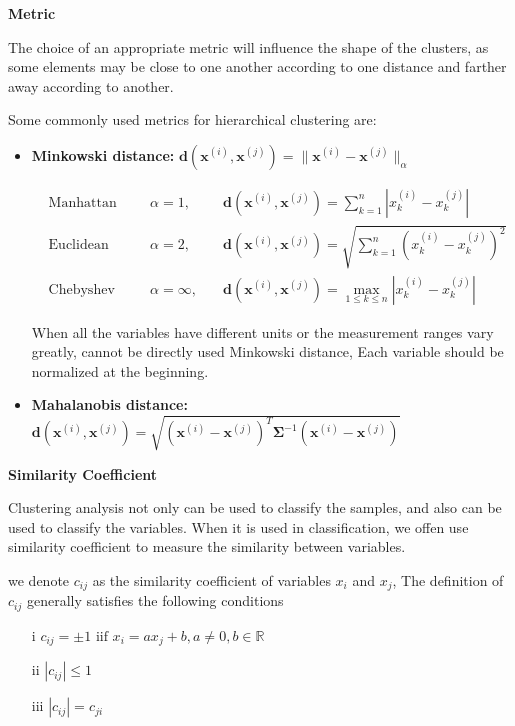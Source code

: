 \noindent\textbf{Metric}

The choice of an appropriate metric will influence the shape of the clusters, as some elements may be close to one another according to one distance and farther away according to another.

Some commonly used metrics for hierarchical clustering are:

\begin{itemize}
\item \textbf{Minkowski distance:} $\mathbf{d}(\boldsymbol x^{(i)},\boldsymbol x^{(j)}) = \|\boldsymbol x^{(i)} - \boldsymbol x^{(j)}\|_\alpha$
	
	\begin{align*}
	&\text{Manhattan distance:} &\alpha = 1,\quad &\mathbf{d}(\boldsymbol x ^{(i)},\boldsymbol x ^{(j)}) = \sum_{k=1}^n|x_{k}^{(i)}-x_{k}^{(j)}|\\
	&\text{Euclidean distance:}  &\alpha = 2,\quad &\mathbf{d}(\boldsymbol x ^{(i)},\boldsymbol x ^{(j)}) = \sqrt{\sum_{k=1}^n(x_{k}^{(i)}-x_{k}^{(j)})^2}\\
	&\text{Chebyshev distance:}  &\alpha = \infty,\quad &\mathbf{d}(\boldsymbol x ^{(i)},\boldsymbol x ^{(j)}) = \max_{1\leq k \leq n}|x_{k}^{(i)}-x_{k}^{(j)}|
	\end{align*}

When all the variables have different units or the measurement ranges vary greatly, cannot be directly used Minkowski distance, Each variable should be normalized at the beginning.


\item \textbf{Mahalanobis distance:} $\mathbf{d}(\boldsymbol x ^{(i)},\boldsymbol x ^{(j)}) = \sqrt{(\boldsymbol x ^{(i)} - \boldsymbol x ^{(j)})^T\mathbf{\Sigma}^{-1} (\boldsymbol x ^{(i)} - \boldsymbol x ^{(j)})}$

\end{itemize}


\noindent\textbf{Similarity Coefficient}

Clustering analysis not only can be used to classify the samples, and also can be used to classify the variables. When it is used in classification, we offen use similarity coefficient to measure the similarity between variables.

we denote $c_{ij}$ as the similarity coefficient of variables $x_i$ and $x_j$, The definition of $c_{ij}$ generally satisfies the following conditions

\begin{itemize}
	\item[i] $c_{ij}=\pm 1\text{ iif } x_i = ax_j + b, a\neq 0, b\in\mathbb{R}$
	\item[ii] $|c_{ij}| \leq 1$
	\item[iii] $|c_{ij}| = c_{ji}$
\end{itemize}

